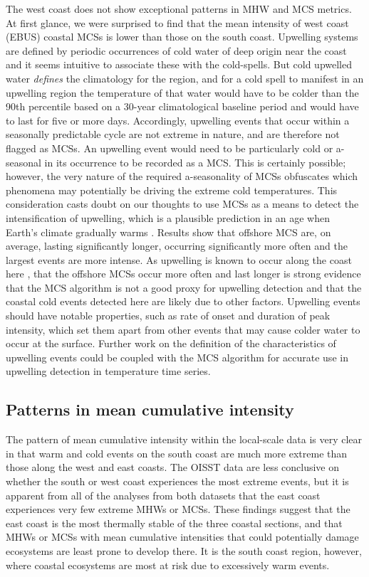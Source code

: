 \documentclass[a4paper,10pt,review]{elsarticle}
\begin{document}
The west coast does not show exceptional patterns in MHW and MCS metrics. At first glance, we were surprised to find that the mean intensity of west coast (EBUS) coastal MCSs is lower than those on the south coast. Upwelling systems are defined by periodic occurrences of cold water of deep origin near the coast \citep{Lutjeharms2000, Hutchings2009} and it seems intuitive to associate these with the cold-spells. But cold upwelled water \emph{defines} the climatology for the region, and for a cold spell to manifest in an upwelling region the temperature of that water would have to be colder than the 90th percentile based on a 30-year climatological baseline period and would have to last for five or more days. Accordingly, upwelling events that occur within a seasonally predictable cycle are not extreme in nature, and are therefore not flagged as MCSs. An upwelling event would need to be particularly cold or a-seasonal in its occurrence to be recorded as a MCS. This is certainly possible; however, the very nature of the required a-seasonality of MCSs obfuscates which phenomena may potentially be driving the extreme cold temperatures. This consideration casts doubt on our thoughts to use MCSs as a means to detect the intensification of upwelling, which is a plausible prediction in an age when Earth's climate gradually warms \citep{Garcia-Reyes2015}. Results show that offshore MCS are, on average, lasting significantly longer, occurring significantly more often and the largest events are more intense. As upwelling is known to occur along the coast here \citep{Hutchings2009}, that the offshore MCSs occur more often and last longer is strong evidence that the MCS algorithm is not a good proxy for upwelling detection and that the coastal cold events detected here are likely due to other factors. Upwelling events should have notable properties, such as rate of onset and duration of peak intensity, which set them apart from other events that may cause colder water to occur at the surface. Further work on the definition of the characteristics of upwelling events could be coupled with the MCS algorithm for accurate use in upwelling detection in temperature time series.

\subsection{Patterns in mean cumulative intensity}
The pattern of mean cumulative intensity within the local-scale data is very clear in that warm and cold events on the south coast are much more extreme than those along the west and east coasts. The OISST data are less conclusive on whether the south or west coast experiences the most extreme events, but it is apparent from all of the analyses from both datasets that the east coast experiences very few extreme MHWs or MCSs. These findings suggest that the east coast is the most thermally stable of the three coastal sections, and that MHWs or MCSs with mean cumulative intensities that could potentially damage ecosystems are least prone to develop there. It is the south coast region, however, where coastal ecosystems are most at risk due to excessively warm events.
\end{document}

